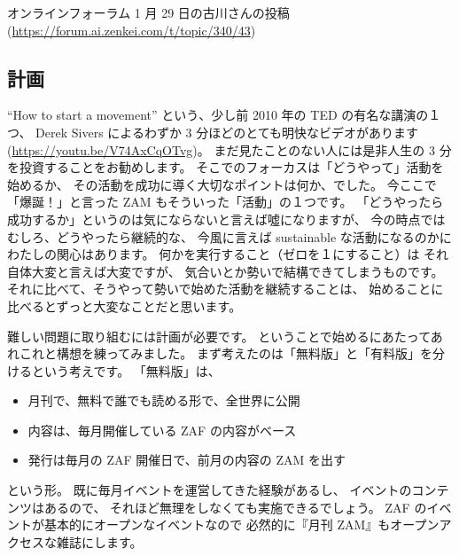 \documentclass[dvipdfmx,autodetect-engine,10pt,b5paper,papersize,openany,dvipsnames]{jsbook}
\begin{document}
\vspace{3.1cm}

\begin{center}
オンラインフォーラム 1 月 29 日の古川さんの投稿\\
(\url{https://forum.ai.zenkei.com/t/topic/340/43})
\end{center}

\begin{multicols}{2}

\section{計画}
``How to start a movement''
という、少し前 2010 年の TED の有名な講演の１つ、
Derek Sivers によるわずか 3 分ほどのとても明快なビデオがあります
(\url{https://youtu.be/V74AxCqOTvg})。
まだ見たことのない人には是非人生の 3 分を投資することをお勧めします。
そこでのフォーカスは「どうやって」活動を始めるか、
その活動を成功に導く大切なポイントは何か、でした。
今ここで「爆誕！」と言った ZAM もそういった「活動」の１つです。
「どうやったら成功するか」というのは気にならないと言えば噓になりますが、
今の時点ではむしろ、どうやったら継続的な、
今風に言えば sustainable な活動になるのかにわたしの関心はあります。
何かを実行すること（ゼロを１にすること）は
それ自体大変と言えば大変ですが、
気合いとか勢いで結構できてしまうものです。
それに比べて、そうやって勢いで始めた活動を継続することは、
始めることに比べるとずっと大変なことだと思います。

難しい問題に取り組むには計画が必要です。
ということで始めるにあたってあれこれと構想を練ってみました。
まず考えたのは「無料版」と「有料版」を分けるという考えです。
「無料版」は、
\begin{itemize}
\item 月刊で、無料で誰でも読める形で、全世界に公開
\item 内容は、毎月開催している ZAF の内容がベース
\item 発行は毎月の ZAF 開催日で、前月の内容の ZAM を出す
\end{itemize}
という形。
既に毎月イベントを運営してきた経験があるし、
イベントのコンテンツはあるので、
それほど無理をしなくても実施できるでしょう。
ZAF のイベントが基本的にオープンなイベントなので
必然的に『月刊 ZAM』もオープンアクセスな雑誌にします。


\end{multicols}
\end{document}
